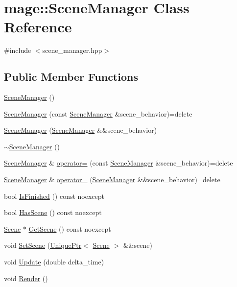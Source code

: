 \hypertarget{classmage_1_1_scene_manager}{}\section{mage\+:\+:Scene\+Manager Class Reference}
\label{classmage_1_1_scene_manager}


{\ttfamily \#include $<$scene\+\_\+manager.\+hpp$>$}

\subsection*{Public Member Functions}
\begin{DoxyCompactItemize}
\item 
\hyperlink{classmage_1_1_scene_manager_a25a1185ca41db52d046a5901b301a0be}{Scene\+Manager} ()
\item 
\hyperlink{classmage_1_1_scene_manager_a450ce8e4d52483a2dcc3bb090f565373}{Scene\+Manager} (const \hyperlink{classmage_1_1_scene_manager}{Scene\+Manager} \&scene\+\_\+behavior)=delete
\item 
\hyperlink{classmage_1_1_scene_manager_ae8f4c6553e27b0bc00f0ea40f0e3770c}{Scene\+Manager} (\hyperlink{classmage_1_1_scene_manager}{Scene\+Manager} \&\&scene\+\_\+behavior)
\item 
\hyperlink{classmage_1_1_scene_manager_a849386b052d6ae8945c9554f888e1707}{$\sim$\+Scene\+Manager} ()
\item 
\hyperlink{classmage_1_1_scene_manager}{Scene\+Manager} \& \hyperlink{classmage_1_1_scene_manager_a90c17a35f737879fa07acb28f6d787af}{operator=} (const \hyperlink{classmage_1_1_scene_manager}{Scene\+Manager} \&scene\+\_\+behavior)=delete
\item 
\hyperlink{classmage_1_1_scene_manager}{Scene\+Manager} \& \hyperlink{classmage_1_1_scene_manager_a5f2e494edeb329e54a928a1bc0f5f7df}{operator=} (\hyperlink{classmage_1_1_scene_manager}{Scene\+Manager} \&\&scene\+\_\+behavior)=delete
\item 
bool \hyperlink{classmage_1_1_scene_manager_adeb1fd1d9f40229ccb0ef8adfb55f4cc}{Is\+Finished} () const noexcept
\item 
bool \hyperlink{classmage_1_1_scene_manager_ac767593112ea1d8b47cc79283cf7c47e}{Has\+Scene} () const noexcept
\item 
\hyperlink{classmage_1_1_scene}{Scene} $\ast$ \hyperlink{classmage_1_1_scene_manager_a55d720c9f90cfc46dbf07d46537072c1}{Get\+Scene} () const noexcept
\item 
void \hyperlink{classmage_1_1_scene_manager_abd9572b72caa412eda1f6c4e5d771fc3}{Set\+Scene} (\hyperlink{namespacemage_a3316d7143a973e37adf1110f2e80ca31}{Unique\+Ptr}$<$ \hyperlink{classmage_1_1_scene}{Scene} $>$ \&\&scene)
\item 
void \hyperlink{classmage_1_1_scene_manager_a7f8838492e183442e03b80e2e9f59991}{Update} (double delta\+\_\+time)
\item 
void \hyperlink{classmage_1_1_scene_manager_ac9ddb36bbd324bee8c702ea604633775}{Render} ()
\end{DoxyCompactItemize}
